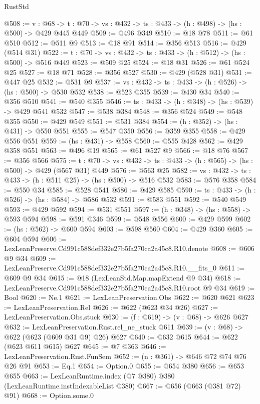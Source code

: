 \begin{lexlean}{RustStd}
\begin{coremodule}
@508 := {v : @68} ->
  {t : @70} -> {vs : @432} -> {ts : @433} -> (h : @498) -> (hs : @500) -> @429 @445 @449
@509 := @496 @349
@510 := @18 @78
@511 := @61 @510
@512 := @511 @9
@513 := @18 @91
@514 := @356 @513
@516 := @429 (@514 @31)
@522 := {t : @70} -> {vs : @432} -> {ts : @433} -> (h : @512) -> (hs : @500) -> @516 @449
@523 := @509 @25
@524 := @18 @31
@526 := @61 @524 @25
@527 := @18 @71
@528 := @356 @527
@530 := @429 (@528 @31)
@531 := @447 @25
@532 := @531 @9
@537 := {vs : @432} -> {ts : @433} -> (h : @526) -> (hs : @500) -> @530 @532
@538 := @523 @355
@539 := @430 @34
@540 := @356 @510
@541 := @540 @355
@546 := {ts : @433} -> (h : @348) -> (hs : @539) -> @429 @541 @532
@547 := @538 @384
@548 := @356 @524
@549 := @548 @355
@550 := @429 @549
@551 := @531 @384
@554 := (h : @352) -> (hs : @431) -> @550 @551
@555 := @547 @350
@556 := @359 @355
@558 := @429 @556 @551
@559 := (hs : @431) -> @558
@560 := @555 @428
@562 := @429 @358 @551
@563 := @496 @19
@565 := @61 @527 @9
@566 := @18 @76
@567 := @356 @566
@575 := {t : @70} -> {vs : @432} -> {ts : @433} -> (h : @565) -> (hs : @500) -> @429 (@567 @31) @449
@576 := @563 @25
@582 := {vs : @432} -> {ts : @433} -> (h : @511 @25) -> (hs : @500) -> @516 @532
@583 := @576 @358
@584 := @550 @34
@585 := @528 @541
@586 := @429 @585
@590 := {ts : @433} -> (h : @526) -> (hs : @584) -> @586 @532
@591 := @583 @551
@592 := @540 @549
@593 := @429 @592
@594 := @531 @551
@597 := (h : @348) -> (hs : @558) -> @593 @594
@598 := @591 @346
@599 := @548 @556
@600 := @429 @599
@602 := (hs : @562) -> @600 @594
@603 := @598 @560
@604 := @429 @360
@605 := @604 @594
@606 := LexLeanPreserve.Cd991c588def332e27b5fa270ca2a45c8.R10.denote
@608 := @606 @9 @34
@609 := LexLeanPreserve.Cd991c588def332e27b5fa270ca2a45c8.R10.__fits_0
@611 := @609 @9 @34
@615 := @18 (LexLeanStd.Map.mapExtend @9 @34)
@618 := LexLeanPreserve.Cd991c588def332e27b5fa270ca2a45c8.R10.root @9 @34
@619 := Bool
@620 := Ne.{1}
@621 := LexLeanPreservation.Obs
@622 := @620 @621
@623 := LexLeanPreservation.Rel
@626 := @622 (@623 @34 @26)
@627 := LexLeanPreservation.Obs.stuck
@630 := (f : @619) -> (v : @68) -> @626 @627
@632 := LexLeanPreservation.Rust.rel_ne_stuck @611
@639 := (v : @68) -> @622 (@623 (@609 @31 @9) @26) @627
@640 := @632 @615
@644 := @622 (@623 @611 @615) @627
@645 := @7 @363
@646 := LexLeanPreservation.Rust.FunSem
@652 := (n : @361) -> @646 @72 @74 @76 @26 @91
@653 := Eq.{1}
@654 := Option.{0}
@655 := @654 @380
@656 := @653 @655
@663 := LexLeanRuntime.index (@7 @380) @380 (LexLeanRuntime.instIndexableList @380)
@667 := @656 (@663 (@381 @72) @91)
@668 := Option.some.{0}

\end{coremodule}
\end{lexlean}

